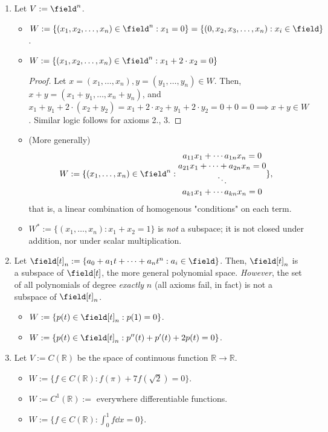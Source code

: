 \begin{example}
    \begin{enumerate}
        \item Let $V := \field^n$.
        \begin{itemize}
            \item $W:= \{(x_1, x_2, \dots, x_n) \in \field^n:x_1 = 0\} = \{(0, x_2, x_3, \dots, x_n) :x_i \in \field\}$.
            \item $W:= \{(x_1, x_2, \dots, x_n)\in \field^n : x_1 + 2 \cdot x_2 = 0\}$
            \begin{proof}
                Let $x = (x_1, \dots, x_n), y=(y_1, \dots, y_n) \in W$. Then, $x+y = (x_1 + y_1, \dots, x_n + y_n)$, and $x_1 + y_1 + 2 \cdot (x_2 + y_2) = x_1 + 2 \cdot x_2 + y_1 + 2 \cdot y_2 = 0 + 0 = 0 \implies x+ y \in W$. Similar logic follows for axioms 2., 3.
            \end{proof}
            \item (More generally) $$
            W := \{(x_1, \dots, x_n) \in \field^n : \begin{matrix}
                a_{11} x_1 + \cdots a_{1n} x_n = 0\\
                a_{21} x_1 + \cdots + a_{2n} x_n = 0\\
                \ddots\\
                a_{k1} x_1 + \cdots a_{kn} x_n = 0
            \end{matrix}            
                \},
            $$
            that is, a linear combination of homogenous "conditions" on each term.
            \item $W^*:= \{(x_1, \dots, x_n) : x_1 + x_2 = 1\}$ is \emph{not} a subspace; it is not closed under addition, nor under scalar multiplication.
        \end{itemize}
        \item Let $\field[t]_n :=  \{a_0 + a_1 t + \cdots + a_n t^n : a_i \in \field\}$. Then, $\field[t]_n$ is a subspace of $\field[t]$, the more general polynomial space. \emph{However}, the set of all polynomials of degree \emph{exactly} $n$ (all axioms fail, in fact) is not a subspace of $\field[t]_n$.
        \begin{itemize}
            \item $W:= \{p(t) \in \field[t]_n : p(1)=0 \}$.
            \item $W:=\{p(t) \in \field[t]_n : p''(t) + p'(t) + 2p(t)= 0\}$.
        \end{itemize}
        \item Let $V := C(\mathbb{R})$ be the space of continuous function $\mathbb{R} \to \mathbb{R}$.
        \begin{itemize}
            \item $W := \{f \in C(\mathbb{R}) : f(\pi) + 7 f(\sqrt{2}) = 0 \}$.
            \item $W := C^1(\mathbb{R}) :=$ everywhere differentiable functions.
            \item $W:= \{ f \in C(\mathbb{R}) : \int_0^1 f \dd{x} = 0\}$.
        \end{itemize}
    \end{enumerate}
\end{example}

